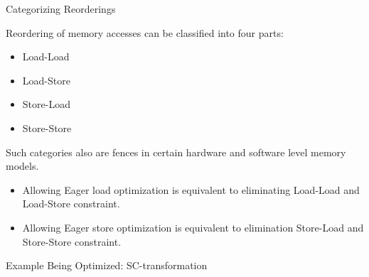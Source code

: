 \documentclass{beamer}
\begin{document}

    \begin{frame}{Categorizing Reorderings}

        Reordering of memory accesses can be classified into four parts:
        \begin{itemize}
            \item Load-Load
            \item Load-Store
            \item Store-Load
            \item Store-Store
        \end{itemize}

        Such categories also are fences in certain hardware and software level memory models. 

        \begin{itemize}
            \item Allowing Eager load optimization is equivalent to eliminating Load-Load and Load-Store constraint.
            \item Allowing Eager store optimization is equivalent to elimination Store-Load and Store-Store constraint.
        \end{itemize}

    \end{frame}



    \begin{frame}{Example Being Optimized: SC-transformation}

        \begin{figure}
        \end{figure}
        
    \end{frame}
\end{document}
